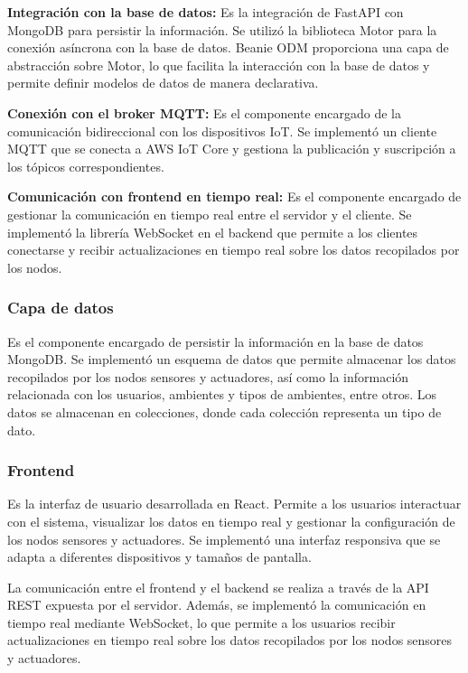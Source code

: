 \textbf{Integración con la base de datos:} Es la integración de FastAPI con MongoDB
para persistir la información. Se utilizó la biblioteca Motor para la conexión
asíncrona con la base de datos. Beanie ODM proporciona una capa
de abstracción sobre Motor, lo que facilita la interacción con la base de datos y
permite definir modelos de datos de manera declarativa.

\textbf{Conexión con el broker MQTT:} Es el componente encargado de la comunicación
bidireccional con los dispositivos IoT. Se implementó un cliente MQTT que se conecta
a AWS IoT Core y gestiona la publicación y suscripción a los tópicos correspondientes.

\textbf{Comunicación con frontend en tiempo real:} Es el componente
encargado de gestionar la comunicación en tiempo real entre el servidor y el cliente.
Se implementó la librería WebSocket en el backend que permite a los clientes conectarse
y recibir actualizaciones en tiempo real sobre los datos recopilados por los nodos.

\subsubsection{Capa de datos}

Es el componente encargado de persistir la información en la base de datos
MongoDB. Se implementó un esquema de datos que permite almacenar los datos
recopilados por los nodos sensores y actuadores, así como la información
relacionada con los usuarios, ambientes y tipos de ambientes, entre otros. Los
datos se almacenan en colecciones, donde cada colección representa un tipo de
dato.

\subsubsection{Frontend}

Es la interfaz de usuario desarrollada en React. Permite a los usuarios
interactuar con el sistema, visualizar los datos en tiempo real y gestionar la
configuración de los nodos sensores y actuadores. Se implementó una interfaz
responsiva que se adapta a diferentes dispositivos y tamaños de pantalla.

La comunicación entre el frontend y el backend se realiza a través de la API
REST expuesta por el servidor. Además, se implementó la comunicación en tiempo
real mediante WebSocket, lo que permite a los usuarios recibir actualizaciones
en tiempo real sobre los datos recopilados por los nodos sensores y actuadores.

